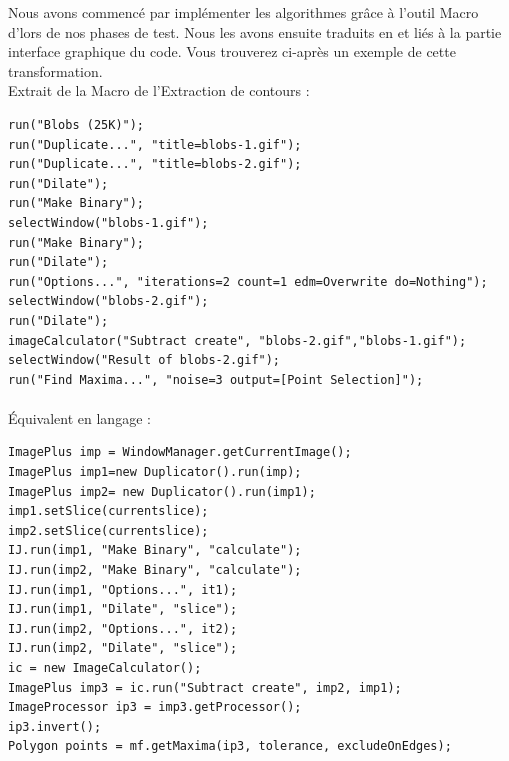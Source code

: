 Nous avons commencé par implémenter les algorithmes grâce à l'outil Macro d'\imj lors de nos  phases de test. Nous les avons ensuite traduits en \java et liés à la partie interface graphique du code. Vous trouverez ci-après un exemple de cette transformation. \\

Extrait de la Macro de l'Extraction de contours :
\begin{center}
\begin{fmpage}{16cm}
\begin{small}
\begin{lstlisting}
run("Blobs (25K)");
run("Duplicate...", "title=blobs-1.gif");
run("Duplicate...", "title=blobs-2.gif");
run("Dilate");
run("Make Binary");
selectWindow("blobs-1.gif");
run("Make Binary");
run("Dilate");
run("Options...", "iterations=2 count=1 edm=Overwrite do=Nothing");
selectWindow("blobs-2.gif");
run("Dilate");
imageCalculator("Subtract create", "blobs-2.gif","blobs-1.gif");
selectWindow("Result of blobs-2.gif");
run("Find Maxima...", "noise=3 output=[Point Selection]");
\end{lstlisting}
\end{small}	
\end{fmpage}
\end{center}

\paragraph*{}
\pagebreak
Équivalent en langage \java :
\begin{center}
\begin{fmpage}{16cm}
\begin{small}
\begin{lstlisting}
ImagePlus imp = WindowManager.getCurrentImage();
ImagePlus imp1=new Duplicator().run(imp);
ImagePlus imp2= new Duplicator().run(imp1);
imp1.setSlice(currentslice);
imp2.setSlice(currentslice);
IJ.run(imp1, "Make Binary", "calculate");
IJ.run(imp2, "Make Binary", "calculate");
IJ.run(imp1, "Options...", it1);
IJ.run(imp1, "Dilate", "slice");
IJ.run(imp2, "Options...", it2);
IJ.run(imp2, "Dilate", "slice");
ic = new ImageCalculator();
ImagePlus imp3 = ic.run("Subtract create", imp2, imp1);
ImageProcessor ip3 = imp3.getProcessor();
ip3.invert();
Polygon points = mf.getMaxima(ip3, tolerance, excludeOnEdges);
\end{lstlisting}
\end{small}	
\end{fmpage}
\end{center}


